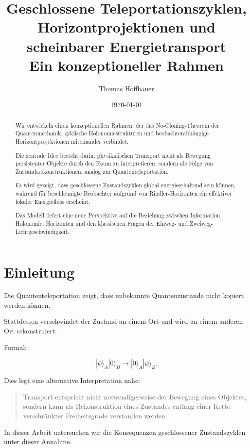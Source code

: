\documentclass[11pt,a4paper]{article}
\title{Geschlossene Teleportationszyklen, Horizontprojektionen und scheinbarer Energietransport\\
	Ein konzeptioneller Rahmen}
\author{Thomas Hoffbauer}
\date{\today}
\begin{document}
	
	\maketitle
	
	\begin{abstract}
		
		Wir entwickeln einen konzeptionellen Rahmen, der das No-Cloning-Theorem der Quantenmechanik, zyklische Holonomiestrukturen und beobachterabhängige Horizontprojektionen miteinander verbindet.
		
		Die zentrale Idee besteht darin, physikalischen Transport nicht als Bewegung persistenter Objekte durch den Raum zu interpretieren, sondern als Folge von Zustandsrekonstruktionen, analog zur Quantenteleportation.
		
		Es wird gezeigt, dass geschlossene Zustandszyklen global energieerhaltend sein können, während für beschleunigte Beobachter aufgrund von Rindler-Horizonten ein effektiver lokaler Energiefluss erscheint.
		
		Das Modell liefert eine neue Perspektive auf die Beziehung zwischen Information, Holonomie, Horizonten und den klassischen Fragen der Einweg- und Zweiweg-Lichtgeschwindigkeit.
		
	\end{abstract}
	
	\section{Einleitung}
	
	Die Quantenteleportation zeigt, dass unbekannte Quantenzustände nicht kopiert werden können.
	
	Stattdessen verschwindet der Zustand an einem Ort und wird an einem anderen Ort rekonstruiert.
	
	Formal:
	
	\[
	|\psi\rangle_A |0\rangle_B
	\longrightarrow
	|0\rangle_A |\psi\rangle_B.
	\]
	
	Dies legt eine alternative Interpretation nahe:
	
	\begin{quote}
		Transport entspricht nicht notwendigerweise der Bewegung eines Objektes, sondern kann als Rekonstruktion eines Zustandes entlang einer Kette verschränkter Freiheitsgrade verstanden werden.
	\end{quote}
	
	In dieser Arbeit untersuchen wir die Konsequenzen geschlossener Zustandszyklen unter dieser Annahme.
	
\end{document}
